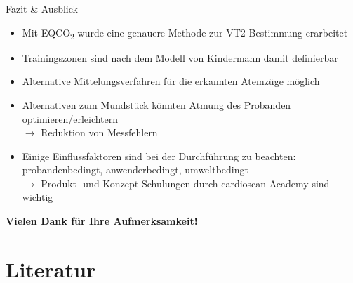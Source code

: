 \documentclass[colorBG,slideColor,8pt]{beamer}
\newcommand{\eqcotwo}{EQCO\textsubscript{2}}
\begin{document}
\begin{frame}{Fazit \& Ausblick}
\begin{itemize}
	\item Mit \eqcotwo{} wurde eine genauere Methode zur VT2-Bestimmung erarbeitet
	\item Trainingszonen sind nach dem Modell von Kindermann damit definierbar
	\item Alternative Mittelungsverfahren für die erkannten Atemzüge möglich
	\item Alternativen zum Mundstück könnten Atmung des Probanden optimieren/erleichtern\\$\rightarrow$ Reduktion von Messfehlern
	\item Einige Einflussfaktoren sind bei der Durchführung zu beachten: probandenbedingt, anwenderbedingt, umweltbedingt\\$\rightarrow$ Produkt- und Konzept-Schulungen durch cardioscan Academy sind wichtig
\end{itemize}
\end{frame}

\begin{frame}
\begin{center}
	\large{\textbf{Vielen Dank für Ihre Aufmerksamkeit!}}
\end{center}
\end{frame}

\section{Literatur}

\begin{frame}
\begin{columns}
\begin{column}{0.9\linewidth}
\nocite{*}
\printbibliography[heading=none]
\end{column}
\end{columns}
\end{frame}
\end{document}
